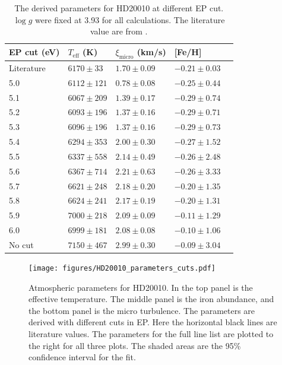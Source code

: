 \documentclass{aa}
\begin{document}
\begin{table}[htb!]
    \caption{The derived parameters for HD20010 at different EP cut. $\log g$
        were fixed at 3.93 for all calculations. The literature value are from \cite{Santos2004}.}
    \label{tab:hd20010}
    \centering
    \begin{tabular}{lllll}
      \hline\hline
        EP cut (eV) & $T_\mathrm{eff}$ (K) & $\xi_\mathrm{micro}$ (km/s) & [Fe/H]               \\
      \hline
        Literature  & $6170 \pm  33$       & $1.70 \pm 0.09$             & $-0.21 \pm 0.03$      \\
      \hline
        5.0         & $6112 \pm 121$       & $0.78 \pm 0.08$             & $-0.25 \pm 0.44$      \\
        5.1         & $6067 \pm 209$       & $1.39 \pm 0.17$             & $-0.29 \pm 0.74$      \\
        5.2         & $6093 \pm 196$       & $1.37 \pm 0.16$             & $-0.29 \pm 0.71$      \\
        5.3         & $6096 \pm 196$       & $1.37 \pm 0.16$             & $-0.29 \pm 0.73$      \\
        5.4         & $6294 \pm 353$       & $2.00 \pm 0.30$             & $-0.27 \pm 1.52$      \\
        5.5         & $6337 \pm 558$       & $2.14 \pm 0.49$             & $-0.26 \pm 2.48$      \\
        5.6         & $6367 \pm 714$       & $2.21 \pm 0.63$             & $-0.26 \pm 3.33$      \\
        5.7         & $6621 \pm 248$       & $2.18 \pm 0.20$             & $-0.20 \pm 1.35$      \\
        5.8         & $6624 \pm 241$       & $2.17 \pm 0.19$             & $-0.20 \pm 1.31$      \\
        5.9         & $7000 \pm 218$       & $2.09 \pm 0.09$             & $-0.11 \pm 1.29$      \\
        6.0         & $6999 \pm 181$       & $2.08 \pm 0.08$             & $-0.10 \pm 1.06$      \\
        No cut      & $7150 \pm 467$       & $2.99 \pm 0.30$             & $-0.09 \pm 3.04$      \\
      \hline
    \end{tabular}
\end{table}



\begin{figure}[tpb!]
    \centering
    \texttt{[image: figures/HD20010\_parameters\_cuts.pdf]}
    \caption{Atmospheric parameters for HD20010. In the top panel is
    the effective temperature. The middle panel is the iron abundance,
    and the bottom panel is the micro turbulence. The parameters are
    derived with different cuts in EP. Here the horizontal black lines
    are literature values. The parameters for the full line list are
    plotted to the right for all three plots. The shaded areas are the
    95\% confidence interval for the fit.}
    \label{fig:HD20010_parameters_cuts}
\end{figure}
\end{document}
